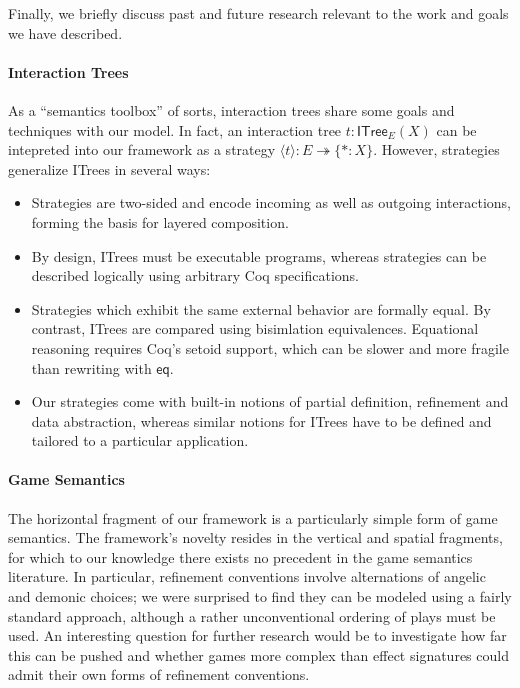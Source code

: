 \documentclass[acmsmall,screen,review,nonacm]{acmart}
\newcommand{\kw}[1]{\ensuremath{ \mathsf{#1} }}
\begin{document}
Finally, we briefly discuss past and future research
relevant to the work and goals we have described.

\paragraph{Interaction Trees}

As a ``semantics toolbox'' of sorts,
interaction trees share some goals and techniques with our model.
In fact, an interaction tree $t : \kw{ITree}_E(X)$
can be intepreted into our framework as a strategy
$\langle t \rangle : E \twoheadrightarrow \{ {*} : X \}$.
However, strategies generalize ITrees in several ways:
\begin{itemize}
  \item Strategies are two-sided and encode incoming as well as outgoing interactions,
    forming the basis for layered composition.
  \item By design, ITrees must be executable programs,
    whereas strategies can be described logically using arbitrary Coq specifications.
  \item Strategies which exhibit the same external behavior are formally equal.
    By contrast, ITrees are compared using bisimlation equivalences.
    Equational reasoning requires Coq's setoid support,
    which can be slower and more fragile than rewriting with $\kw{eq}$.
  \item Our strategies come with built-in notions of partial definition,
    refinement and data abstraction,
    whereas similar notions for ITrees
    have to be defined and tailored to a particular application.
\end{itemize}

\paragraph{Game Semantics}

The horizontal fragment of our framework is a particularly simple form of game semantics.
The framework's novelty resides in the vertical and spatial fragments,
for which to our knowledge there exists no precedent in the game semantics literature.
In particular, refinement conventions involve alternations of angelic and demonic choices;
we were surprised to find they can be modeled using a fairly standard approach,
although a rather unconventional ordering of plays must be used.
An interesting question for further research would be to investigate how far this can be pushed
and whether games more complex than effect signatures could admit their own forms of refinement conventions.
\end{document}
